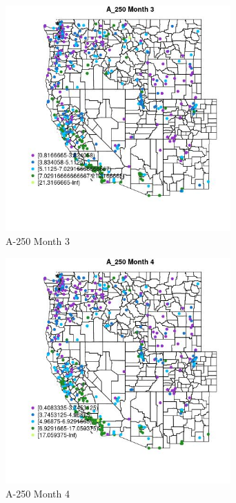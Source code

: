 \begin{figure} 
\centering  
\includegraphics[width=0.77\textwidth]{Code_Outputs/ML_input_report_ML_input_PM25_Step5_part_d_de_duplicated_aves_ML_input_MapObsMo3A_250.jpg} 
\caption{\label{fig:ML_input_report_ML_input_PM25_Step5_part_d_de_duplicated_aves_ML_inputMapObsMo3A_250}A-250 Month 3} 
\end{figure} 
 

\begin{figure} 
\centering  
\includegraphics[width=0.77\textwidth]{Code_Outputs/ML_input_report_ML_input_PM25_Step5_part_d_de_duplicated_aves_ML_input_MapObsMo4A_250.jpg} 
\caption{\label{fig:ML_input_report_ML_input_PM25_Step5_part_d_de_duplicated_aves_ML_inputMapObsMo4A_250}A-250 Month 4} 
\end{figure} 
 

